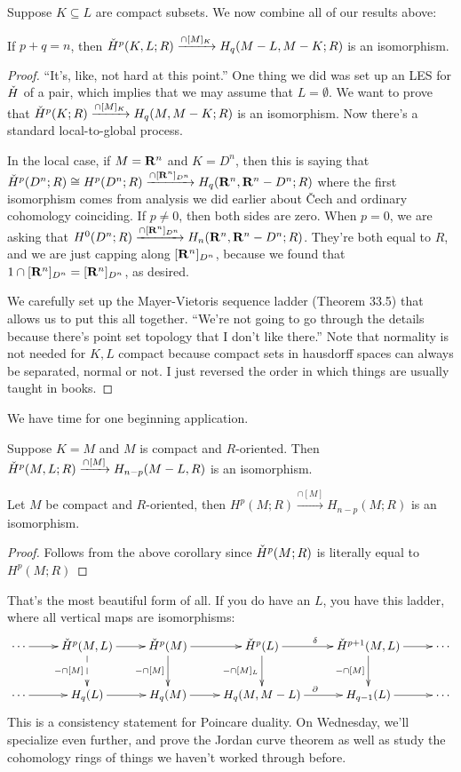 Suppose $K\subseteq L$ are compact subsets. We now combine all of our results above:
\begin{theorem}
If $p+q=n$, then $\check{H}^p(K,L;R)\xrightarrow{\cap[M]_K}H_q(M-L,M-K;R)$ is an isomorphism.
\end{theorem}
\begin{proof}
``It's, like, not hard at this point.'' One thing we did was set up an LES for $\check{H}$ of a pair, which implies that we may assume that $L=\emptyset$. We want to prove that $\check{H}^p(K;R)\xrightarrow{\cap[M]_K}H_q(M,M-K;R)$ is an isomorphism. Now there's a standard local-to-global process.

In the local case, if $M=\mathbf R^n$ and $K=D^n$, then this is saying that $\check{H}^p(D^n;R)\cong H^p(D^n;R)\xrightarrow{\cap[\mathbf R^n]_{D^n}}H_q(\mathbf R^n,\mathbf R^n-D^n;R)$ where the first isomorphism comes from analysis we did earlier about \v{C}ech and ordinary cohomology coinciding. If $p\neq 0$, then both sides are zero. When $p=0$, we are asking that $H^0(D^n;R)\xrightarrow{\cap[\mathbf R^n]_{D^n}}H_n(\mathbf R^n,\mathbf R^n-D^n;R)$. They're both equal to $R$, and we are just capping along $[\mathbf R^n]_{D^n}$, because we found that $1\cap[\mathbf R^n]_{D^n}=[\mathbf R^n]_{D^n}$, as desired.

We carefully set up the Mayer-Vietoris sequence ladder (Theorem 33.5) that allows us to put this all together. ``We're not going to go through the details because there's point set topology that I don't like there.'' Note that normality is not needed for $K,L$ compact because compact sets in hausdorff spaces can always be separated, normal or not. I just reversed the order in which things are usually taught in books.
\end{proof}
We have time for one beginning application.
\begin{corollary}
Suppose $K=M$ and $M$ is compact and $R$-oriented. Then $\check{H}^p(M,L;R)\xrightarrow{\cap[M]}H_{n-p}(M-L,R)$ is an isomorphism.
\end{corollary}
\begin{corollary}
Let $M$ be compact and $R$-oriented, then $H^p(M;R)\xrightarrow{\cap [M]}H_{n-p}(M;R)$ is an isomorphism.
\end{corollary}
\begin{proof}
Follows from the above corollary since $\check{H}^p(M;R)$ is literally equal to $H^p(M;R)$
\end{proof}
That's the most beautiful form of all. If you do have an $L$, you have this ladder, where all vertical maps are isomorphisms:
\begin{equation*}
\xymatrix{
	\cdots\ar[r] & \cHH^p(M,L)\ar[r]\ar@{-->}[d]_{-\cap [M]} & \cHH^p(M)\ar[r]\ar[d]_{-\cap [M]} & \cHH^p(L)\ar[r]^\delta\ar[d]_{-\cap [M]_L} & \cHH^{p+1}(M,L)\ar[r]\ar[d]_{-\cap [M]} & \cdots\\
	\cdots\ar[r] & H_q(L)\ar[r]& H_q(M)\ar[r] & H_q(M,M-L)\ar[r]^\partial & H_{q-1}(L)\ar[r] & \cdots
}
\end{equation*}
This is a consistency statement for Poincare duality. On Wednesday, we'll specialize even further, and prove the Jordan curve theorem as well as study the cohomology rings of things we haven't worked through before.
